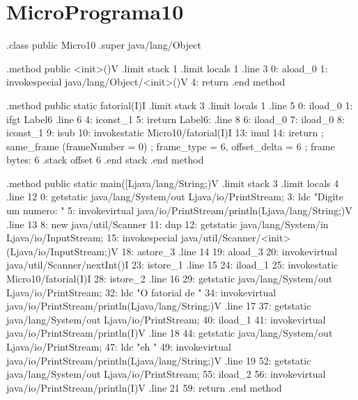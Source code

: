 \documentclass[12pt,a4paper,twoside]{report}
\begin{document}
\section{MicroPrograma10}
\begin{terminal}
.class public Micro10
.super java/lang/Object

.method public <init>()V
  .limit stack 1
  .limit locals 1
  .line 3
  0: aload_0
  1: invokespecial java/lang/Object/<init>()V
  4: return
.end method

.method public static fatorial(I)I
  .limit stack 3
  .limit locals 1
  .line 5
  0: iload_0
  1: ifgt Label6
  .line 6
  4: iconst_1
  5: ireturn
Label6:
  .line 8
  6: iload_0
  7: iload_0
  8: iconst_1
  9: isub
  10: invokestatic Micro10/fatorial(I)I
  13: imul
  14: ireturn
  ; same_frame (frameNumber = 0)
  ; frame_type = 6, offset_delta = 6
  ; frame bytes: 6
  .stack
    offset 6
    .end stack
.end method

.method public static main([Ljava/lang/String;)V
  .limit stack 3
  .limit locals 4
  .line 12
  0: getstatic java/lang/System/out Ljava/io/PrintStream;
  3: ldc "Digite um numero: "
  5: invokevirtual java/io/PrintStream/println(Ljava/lang/String;)V
  .line 13
  8: new java/util/Scanner
  11: dup
  12: getstatic java/lang/System/in Ljava/io/InputStream;
  15: invokespecial java/util/Scanner/<init>(Ljava/io/InputStream;)V
  18: astore_3
  .line 14
  19: aload_3
  20: invokevirtual java/util/Scanner/nextInt()I
  23: istore_1
  .line 15
  24: iload_1
  25: invokestatic Micro10/fatorial(I)I
  28: istore_2
  .line 16
  29: getstatic java/lang/System/out Ljava/io/PrintStream;
  32: ldc "O fatorial de "
  34: invokevirtual java/io/PrintStream/println(Ljava/lang/String;)V
  .line 17
  37: getstatic java/lang/System/out Ljava/io/PrintStream;
  40: iload_1
  41: invokevirtual java/io/PrintStream/println(I)V
  .line 18
  44: getstatic java/lang/System/out Ljava/io/PrintStream;
  47: ldc "eh "
  49: invokevirtual java/io/PrintStream/println(Ljava/lang/String;)V
  .line 19
  52: getstatic java/lang/System/out Ljava/io/PrintStream;
  55: iload_2
  56: invokevirtual java/io/PrintStream/println(I)V
  .line 21
  59: return
.end method


\end{terminal}
\end{document}
